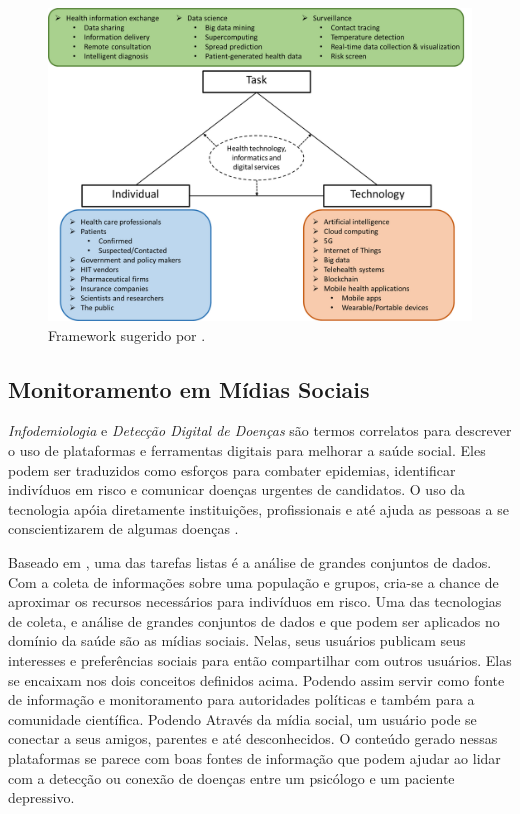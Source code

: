 \documentclass[11pt, notitlepage]{article} %
\begin{document}
\begin{figure}[!ht]
  \centering
  \includegraphics[scale=.45]{Figures/19866-391235-1-PB.png}
  \caption{Framework sugerido por \cite{info:doi/10.2196/19866}.}
  \label{fig:HITframework}
\end{figure}  

\subsection*{Monitoramento em Mídias Sociais}
\textit{Infodemiologia} e \textit{Detecção Digital de Doenças} são termos correlatos para descrever o uso de plataformas e ferramentas digitais para melhorar a saúde social. Eles podem ser traduzidos como esforços para combater epidemias, identificar indivíduos em risco e comunicar doenças urgentes de candidatos. O uso da tecnologia apóia diretamente instituições, profissionais e até ajuda as pessoas a se conscientizarem de algumas doenças \cite{Horvitz}.

Baseado em \cite{info:doi/10.2196/19866}, uma das tarefas listas é a análise de grandes conjuntos de dados. Com a coleta de informações sobre uma população e grupos, cria-se a chance de aproximar os recursos necessários para indivíduos em risco. Uma das tecnologias de coleta, e análise de grandes conjuntos de dados e que podem ser aplicados no domínio da saúde são as mídias sociais. Nelas, seus usuários publicam seus interesses e preferências sociais para então compartilhar com outros usuários. Elas se encaixam nos dois conceitos definidos acima. Podendo assim servir como fonte de informação e monitoramento para autoridades políticas e também para a comunidade científica. Podendo 
Através da mídia social, um usuário pode se conectar a seus amigos, parentes e até desconhecidos.
O conteúdo gerado nessas plataformas se parece com boas fontes de informação que podem ajudar ao lidar com a detecção ou conexão de doenças entre um psicólogo e um paciente depressivo.
\end{document}
